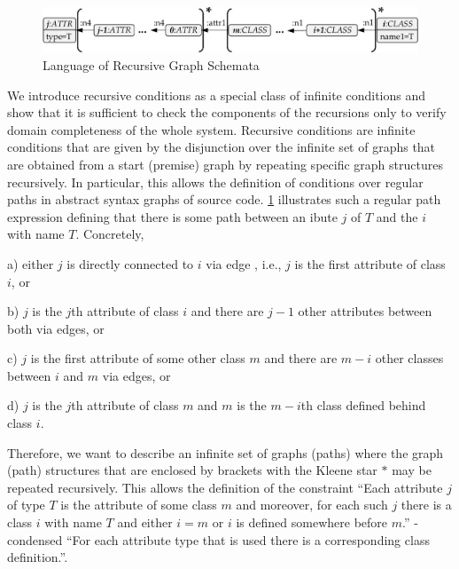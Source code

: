 \begin{figure}[!tb]
\begin{center}
\includegraphics[width=.9\textwidth]{img/software_trans/rec_graph.pdf}
\end{center}
\caption{Language of Recursive Graph Schemata}
\label{fig:sec-compl-software-trans:rec_graph_lang}
\end{figure}

We introduce recursive conditions as a special class of infinite conditions and show that it is sufficient to check the components of the recursions only to verify domain completeness of the whole system.
Recursive conditions are infinite conditions that are given by the disjunction over the infinite set of graphs that are obtained from a start (premise) graph by repeating specific graph structures recursively.
In particular, this allows the definition of conditions over regular paths in abstract syntax graphs of source code.
\cref{fig:sec-compl-software-trans:rec_graph_lang} illustrates such a regular path expression defining that there is some path between an ibute $j$ of  $T$ and the  $i$ with name $T$.
Concretely,
\begin{enumerate*}
\item[a)] either $j$ is directly connected to $i$ via edge , i.e., $j$ is the first attribute of class $i$, or
\item[b)] $j$ is the $j$th attribute of class $i$ and there are $j-1$ other attributes between both via  edges, or
\item[c)] $j$ is the first attribute of some other class $m$ and there are $m-i$ other classes between $i$ and $m$ via  edges, or
\item[d)] $j$ is the $j$th attribute of class $m$ and $m$ is the $m-i$th class defined behind class $i$.
\end{enumerate*}
Therefore, we want to describe an infinite set of graphs (paths) where the graph (path) structures that are enclosed by brackets with the Kleene star $*$ may be repeated recursively.
This allows the definition of the constraint ``Each attribute $j$ of type $T$ is the attribute of some class $m$ and moreover, for each such $j$ there is a class $i$ with name $T$ and either $i=m$ or $i$ is defined somewhere before $m$.'' - condensed ``For each attribute type that is used there is a corresponding class definition.''.
